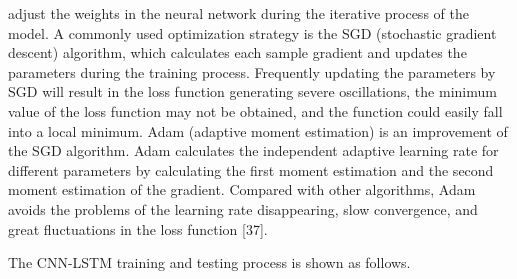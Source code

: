 \documentclass{ieeeaccess}
\begin{document}
adjust the weights in the neural network during the
iterative process of the model. A commonly used optimization
strategy is the SGD (stochastic gradient descent) algorithm,
which calculates each sample gradient and updates
the parameters during the training process. Frequently updating
the parameters by SGD will result in the loss function
generating severe oscillations, the minimum value of the
loss function may not be obtained, and the function could
easily fall into a local minimum. Adam (adaptive moment
estimation) is an improvement of the SGD algorithm. Adam
calculates the independent adaptive learning rate for different
parameters by calculating the first moment estimation and the
second moment estimation of the gradient. Compared with
other algorithms, Adam avoids the problems of the learning
rate disappearing, slow convergence, and great fluctuations in
the loss function [37].\par The CNN-LSTM training and testing process is shown as
follows.\vspace{6pt}
\end{document}
